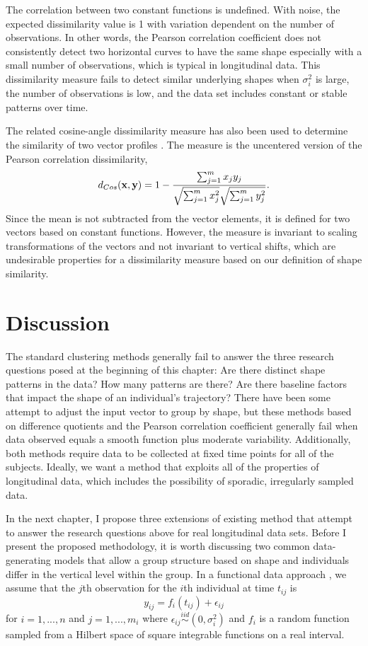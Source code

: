 The correlation between two constant functions is undefined. With noise, the expected dissimilarity value is 1 with variation dependent on the number of observations. In other words, the Pearson correlation coefficient does not consistently detect two horizontal curves to have the same shape especially with a small number of observations, which is typical in longitudinal data. This dissimilarity measure fails to detect similar underlying shapes when $\sigma_{i}^{2}$ is large, the number of observations is low, and the data set includes constant or stable patterns over time. 

The related cosine-angle dissimilarity measure has also been used to determine the similarity of two vector profiles \cite{eisen1998}. The measure is the uncentered version of the Pearson correlation dissimilarity,
$$d_{Cos}(\mathbf x,\mathbf y) = 1- \frac{\sum^{m}_{j=1}x_{j}y_{j}}{\sqrt{\sum^{m}_{j=1}x_{j}^{2}}\sqrt{\sum^{m}_{j=1}y_{j}^{2}}}.$$
Since the mean is not subtracted from the vector elements, it is defined for two vectors based on constant functions. However, the measure is invariant to scaling transformations of the vectors and not invariant to vertical shifts, which are undesirable properties for a dissimilarity measure based on our definition of shape similarity. 

\section{Discussion}
The standard clustering methods generally fail to answer the three research questions posed at the beginning of this chapter: Are there distinct shape patterns in the data? How many patterns are there? Are there baseline factors that impact the shape of an individual's trajectory? There have been some attempt to adjust the input vector to group by shape, but these methods based on difference quotients and the Pearson correlation coefficient generally fail when data observed equals a smooth function plus moderate variability. Additionally, both methods require data to be collected at fixed time points for all of the subjects. Ideally, we want a method that exploits all of the properties of longitudinal data, which includes the possibility of sporadic, irregularly sampled data.

In the next chapter, I propose three extensions of existing method that attempt to answer the research questions above for real longitudinal data sets. Before I present the proposed methodology, it is worth discussing two common data-generating models that allow a group structure based on shape and individuals differ in the vertical level within the group. In a functional data approach \cite{ramsay2002}, we assume that the $j$th observation for the $i$th individual at time $t_{ij}$ is
$$y_{ij}= f_i(t_{ij})+\epsilon_{ij}$$
for $i=1,...,n$ and $j=1,...,m_{i}$ where $\epsilon_{ij}\overset{iid}{\sim} (0,\sigma_{i}^{2})$ and $f_{i}$ is a random function sampled from a Hilbert space of square integrable functions on a real interval. 

